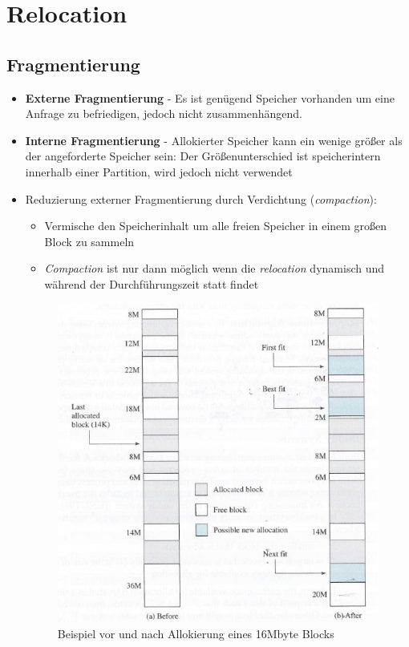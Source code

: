 \documentclass[a4paper]{scrreprt}
\begin{document}
\newpage
\section{Relocation}
\subsection{Fragmentierung}
\begin{itemize}
\item \textbf{Externe Fragmentierung} - Es ist genügend Speicher vorhanden um eine Anfrage zu befriedigen, jedoch nicht zusammenhängend.
\item \textbf{Interne Fragmentierung} - Allokierter Speicher kann ein wenige größer als der angeforderte Speicher sein: Der Größenunterschied ist speicherintern innerhalb einer Partition, wird jedoch nicht verwendet
\item Reduzierung externer Fragmentierung durch Verdichtung (\textit{compaction}):
\begin{itemize}
\item Vermische den Speicherinhalt um alle freien Speicher in einem großen Block zu sammeln
\item \textit{Compaction} ist nur dann möglich wenn die \textit{relocation} dynamisch und während der Durchführungszeit statt findet

\end{itemize}
\begin{figure}[htbp]
\centering
\includegraphics[scale=0.4]{graphics/allocationexample.png}
\caption{Beispiel vor und nach Allokierung eines 16Mbyte Blocks}
\end{figure}
\end{itemize}
\end{document}
